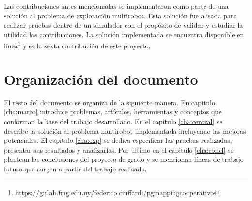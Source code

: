 



Las contribuciones antes mencionadas se implementaron como parte de una
solución al problema de exploración multirobot. Esta solución fue alisada para
realizar pruebas dentro de un simulador con el propósito de validar y estudiar
la utilidad las contribuciones. La solución implementada se encuentra disponible
en
línea\footnote{\url{https://gitlab.fing.edu.uy/federico.ciuffardi/pgmappingcooperativo}}
y es la sexta contribución de este proyecto.

\section{Organización del documento}
El resto del documento se organiza de la siguiente manera. En capitulo
\ref{cha:marco} introduce problemas, artículos, herramientas y conceptos que
conforman la base del trabajo desarrollado. En el capitulo \ref{cha:central} se
describe la solución al problema multirobot implementada incluyendo las mejoras
potenciales. El capitulo \ref{cha:exp} se dedica especificar las pruebas
realizadas, presentar sus resultados y analizarlos. Por ultimo en el capitulo
\ref{cha:concl} se plantean las conclusiones del proyecto de grado y se
mencionan líneas de trabajo futuro que surgen a partir del trabajo realizado.


